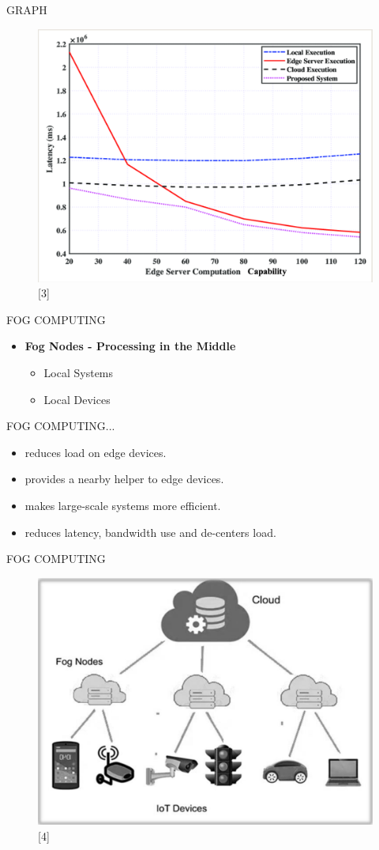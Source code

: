 \documentclass[aspectratio=169,xcolor=dvipsnames]{beamer}
\begin{document}
\begin{frame}{GRAPH}
    \begin{figure}
    \includegraphics[width=0.56\linewidth]{graphicservercomputation.png}
    \caption{[3]}
    \end{figure}
\end{frame}
\begin{frame}{FOG COMPUTING}
    \begin{itemize}
        \item \textbf{Fog Nodes - Processing in the Middle}
        \begin{itemize}
            \item Local Systems
            \item Local Devices
        \end{itemize}
    \end{itemize}
\end{frame}

\begin{frame}{FOG COMPUTING...}
    \begin{itemize}
        \item reduces load on edge devices.
        \item provides a nearby helper to edge devices.
        \item makes large-scale systems more efficient.
        \item reduces latency, bandwidth use and de-centers load.
    \end{itemize}
\end{frame}

\begin{frame}{FOG COMPUTING}
    \begin{figure}
    \includegraphics[width=0.57\linewidth]{fogcomputing.png}
    \caption{[4]}
    \end{figure}
\end{frame}
\end{document}
